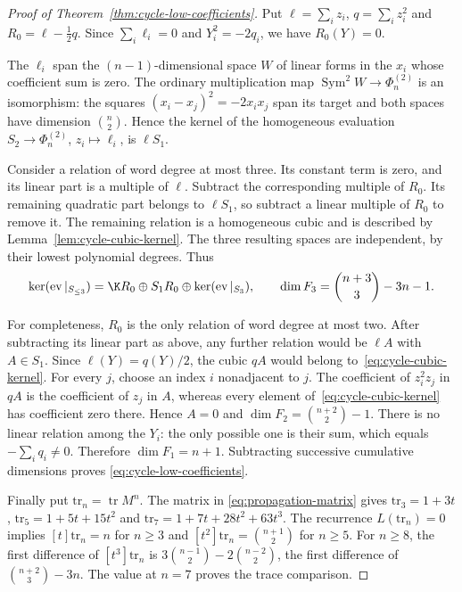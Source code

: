 \begin{proof}[Proof of Theorem~\ref{thm:cycle-low-coefficients}]
Put $\ell=\sum_i z_i$, $q=\sum_i z_i^2$ and
$R_0=\ell-\tfrac12q$. Since $\sum_i\ell_i=0$ and $Y_i^2=-2q_i$,
we have $R_0(Y)=0$.

The $\ell_i$ span the $(n-1)$-dimensional space $W$ of linear forms
in the $x_i$ whose coefficient sum is zero. The ordinary multiplication
map $\operatorname{Sym}^2W\to\Phi_n^{(2)}$ is an isomorphism: the
squares $(x_i-x_j)^2=-2x_ix_j$ span its target and both spaces have
dimension $\binom n2$. Hence the kernel of the homogeneous evaluation
$S_2\to\Phi_n^{(2)}$, $z_i\mapsto\ell_i$, is $\ell S_1$.

Consider a relation of word degree at most three. Its constant term is
zero, and its linear part is a multiple of $\ell$. Subtract the
corresponding multiple of $R_0$. Its remaining quadratic part belongs
to $\ell S_1$, so subtract a linear multiple of $R_0$ to remove it.
The remaining relation is a homogeneous cubic and is described by
Lemma~\ref{lem:cycle-cubic-kernel}. The three resulting spaces are
independent, by their lowest polynomial degrees. Thus
\[
 \ker(\operatorname{ev}|_{S_{\le3}})
 =\K R_0\oplus S_1R_0\oplus\ker(\operatorname{ev}|_{S_3}),
 \qquad
 \dim F_3=\binom{n+3}{3}-3n-1.
\]

For completeness, $R_0$ is the only relation of word degree at most
two. After subtracting its linear part as above, any further relation
would be $\ell A$ with $A\in S_1$. Since $\ell(Y)=q(Y)/2$, the cubic
$qA$ would belong to~\eqref{eq:cycle-cubic-kernel}. For every $j$, choose
an index $i$ nonadjacent to $j$. The coefficient of $z_i^2z_j$ in $qA$
is the coefficient of $z_j$ in $A$, whereas every element
of~\eqref{eq:cycle-cubic-kernel} has coefficient zero there. Hence
$A=0$ and $\dim F_2=\binom{n+2}{2}-1$. There is no linear relation
among the $Y_i$: the only possible one is their sum, which equals
$-\sum_iq_i\ne0$. Therefore $\dim F_1=n+1$.
Subtracting successive cumulative dimensions proves
\eqref{eq:cycle-low-coefficients}.

Finally put $\mathrm{tr}_n=\operatorname{tr}M^n$. The matrix in
\eqref{eq:propagation-matrix} gives
$\mathrm{tr}_3=1+3t$, $\mathrm{tr}_5=1+5t+15t^2$ and
$\mathrm{tr}_7=1+7t+28t^2+63t^3$. The recurrence $L(\mathrm{tr}_n)=0$ implies
$[t]\mathrm{tr}_n=n$ for $n\ge3$ and $[t^2]\mathrm{tr}_n=\binom{n+1}{2}$ for $n\ge5$.
For $n\ge8$, the first difference of $[t^3]\mathrm{tr}_n$ is
$3\binom{n-1}{2}-2\binom{n-2}{2}$, the first difference of
$\binom{n+2}{3}-3n$. The value at $n=7$ proves the trace comparison.
\end{proof}


